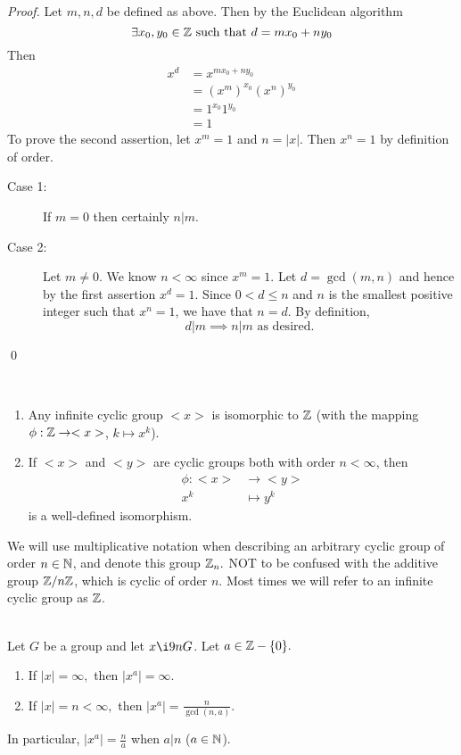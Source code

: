 \begin{proof}
    Let $m, n, d$ be defined as above. Then by the Euclidean algorithm
    $$\exists x_0, y_0 \in \mathbb{Z} \text{ such that } d = mx_0 +ny_0$$
    Then 
    \begin{align*}
        x^d &= x^{mx_0 + ny_0} \\
        &= (x^m)^{x_0}(x^n)^{y_0} \\
        &=1^{x_0}1^{y_0} \\
        &=1
    \end{align*}
    To prove the second assertion, let $x^m = 1$ and $n = |x|$. Then $x^n = 1$ by definition of order.
    \begin{description}
        \item[Case 1: ] If $m = 0$ then certainly $n | m$.
        \item[Case 2: ] Let $m \not = 0$. We know $n < \infty$ since $x^m = 1$. Let $d = \gcd(m,n)$ and hence by the first assertion $x^d = 1$. Since $0 < d \leq n$ and $n$ is the smallest positive integer such that $x^n = 1$, we have that $n = d.$ By definition,
        $$d | m \implies n | m \text{ as desired.}$$
    \end{description}
    \qed
\end{proof}

\begin{theorem} \leavevmode\\
    \begin{enumerate}
        \item Any infinite cyclic group $<x>$ is isomorphic to $\mathbb{Z}$ (with the mapping $\phi : \mathbb{Z} \to <x>$, $k \mapsto x^k$).
        \item If $<x>$ and $<y>$ are cyclic groups both with order $n < \infty$, then
        \begin{align*}
            \phi: <x> &\to <y> \\
            x^k &\mapsto y^k
        \end{align*}
        is a well-defined isomorphism.
    \end{enumerate}
\end{theorem}

We will use multiplicative notation when describing an arbitrary cyclic group of order $n \in \mathbb{N}$, and denote this group $\mathbb{Z}_n.$ NOT to be confused with the additive group $\mathbb{Z}/n\mathbb{Z}$, which is cyclic of order $n$. Most times we will refer to an infinite cyclic group as $\mathbb{Z}$.

\begin{proposition} \leavevmode\\
    \label{prop5}
    Let $G$ be a group and let $x \i9n G$. Let $a \in \mathbb{Z}-\{0\}.$
    \begin{enumerate}
        \item If $|x| = \infty,$ then $|x^a| = \infty$.
        \item If $|x| = n < \infty,$ then $|x^a| = \frac{n}{\gcd(n,a)}$.
    \end{enumerate}
    In particular, $|x^a| = \frac{n}{a}$ when $a|n$ ($a \in \mathbb{N}$).
\end{proposition}

